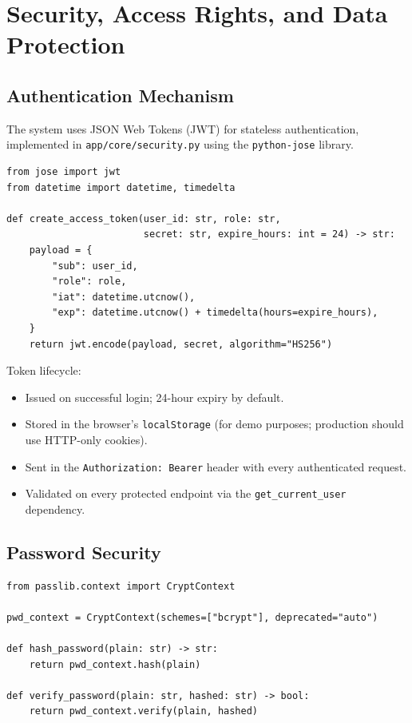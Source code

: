 \chapter{Security, Access Rights, and Data Protection}

\section{Authentication Mechanism}

The system uses JSON Web Tokens (JWT) for stateless authentication, implemented in \texttt{app/core/security.py} using the \texttt{python-jose} library.

\begin{lstlisting}[style=pythonstyle, caption=JWT Token Creation]
from jose import jwt
from datetime import datetime, timedelta

def create_access_token(user_id: str, role: str,
                        secret: str, expire_hours: int = 24) -> str:
    payload = {
        "sub": user_id,
        "role": role,
        "iat": datetime.utcnow(),
        "exp": datetime.utcnow() + timedelta(hours=expire_hours),
    }
    return jwt.encode(payload, secret, algorithm="HS256")
\end{lstlisting}

Token lifecycle:
\begin{itemize}
    \item Issued on successful login; 24-hour expiry by default.
    \item Stored in the browser's \texttt{localStorage} (for demo purposes; production should use HTTP-only cookies).
    \item Sent in the \texttt{Authorization: Bearer} header with every authenticated request.
    \item Validated on every protected endpoint via the \texttt{get\_current\_user} dependency.
\end{itemize}

\section{Password Security}

\begin{lstlisting}[style=pythonstyle, caption=Password Hashing with bcrypt]
from passlib.context import CryptContext

pwd_context = CryptContext(schemes=["bcrypt"], deprecated="auto")

def hash_password(plain: str) -> str:
    return pwd_context.hash(plain)

def verify_password(plain: str, hashed: str) -> bool:
    return pwd_context.verify(plain, hashed)
\end{lstlisting}

